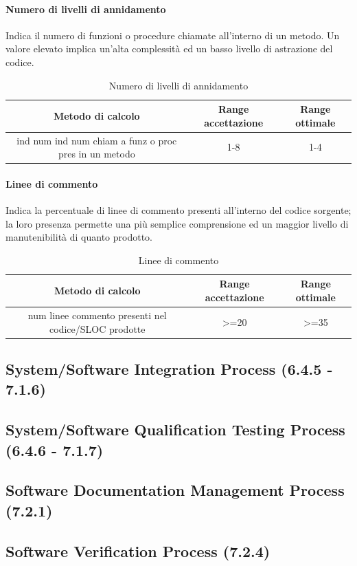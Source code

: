 			\paragraph{Numero di livelli di annidamento}
			Indica il numero di funzioni o procedure chiamate all’interno di un metodo.
			Un valore elevato implica un’alta complessità ed un basso livello di astrazione del codice.
			\begin{table}[H]
				\begin{center}
					\begin{tabular}{|c|c|c|}
						\hline
						\textbf{Metodo di calcolo} & \textbf{Range accettazione} & \textbf{Range ottimale} \\
						\hline
						ind num ind num chiam a funz o proc pres in un metodo & 1-8  & 1-4 \\
						\hline
					\end{tabular}
				\end{center}
				\caption{Numero di livelli di annidamento}
			\end{table}
		
			\paragraph{Linee di commento}
			Indica la percentuale di linee di commento presenti all’interno del codice sorgente; la loro presenza
			permette una più semplice comprensione ed un maggior livello di manutenibilità di quanto
			prodotto.
			\begin{table}[H]
				\begin{center}
					\begin{tabular}{|c|c|c|}
						\hline
						\textbf{Metodo di calcolo} & \textbf{Range accettazione} & \textbf{Range ottimale} \\
						\hline
						num linee commento presenti nel
						codice/SLOC prodotte & >=20  & >=35 \\
						\hline
					\end{tabular}
				\end{center}
				\caption{Linee di commento}
			\end{table}
	
	\subsection{System/Software Integration Process (6.4.5 - 7.1.6)}
	
	\subsection{System/Software Qualification Testing Process (6.4.6 - 7.1.7)}
	
	\subsection{Software Documentation Management Process (7.2.1)}
	
	\subsection{Software Verification Process (7.2.4)}
	